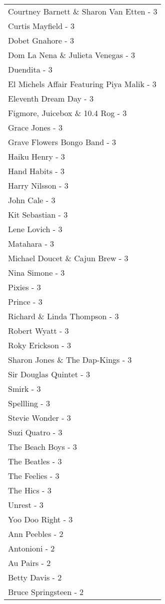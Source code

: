 \documentclass[
]{article}
\begin{document}
\begin{longtable}{l}
Courtney Barnett \& Sharon Van Etten - 3 \\ 
Curtis Mayfield - 3 \\ 
Dobet Gnahore - 3 \\ 
Dom La Nena \& Julieta Venegas - 3 \\ 
Duendita - 3 \\ 
El Michels Affair Featuring Piya Malik - 3 \\ 
Eleventh Dream Day - 3 \\ 
Figmore, Juicebox \& 10.4 Rog - 3 \\ 
Grace Jones - 3 \\ 
Grave Flowers Bongo Band - 3 \\ 
Haiku Henry - 3 \\ 
Hand Habits - 3 \\ 
Harry Nilsson - 3 \\ 
John Cale - 3 \\ 
Kit Sebastian - 3 \\ 
Lene Lovich - 3 \\ 
Matahara - 3 \\ 
Michael Doucet \& Cajun Brew - 3 \\ 
Nina Simone - 3 \\ 
Pixies - 3 \\ 
Prince - 3 \\ 
Richard \& Linda Thompson - 3 \\ 
Robert Wyatt - 3 \\ 
Roky Erickson - 3 \\ 
Sharon Jones \& The Dap-Kings - 3 \\ 
Sir Douglas Quintet - 3 \\ 
Smirk - 3 \\ 
Spellling - 3 \\ 
Stevie Wonder - 3 \\ 
Suzi Quatro - 3 \\ 
The Beach Boys - 3 \\ 
The Beatles - 3 \\ 
The Feelies - 3 \\ 
The Hics - 3 \\ 
Unrest - 3 \\ 
Yoo Doo Right - 3 \\ 
Ann Peebles - 2 \\ 
Antonioni - 2 \\ 
Au Pairs - 2 \\ 
Betty Davis - 2 \\ 
Bruce Springsteen - 2 \\ 

\end{longtable}
\end{document}
